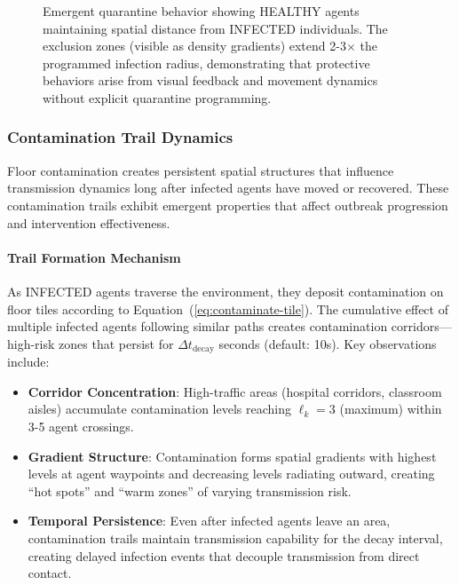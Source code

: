 \begin{figure}[t]
\centering
{}
\caption{Emergent quarantine behavior showing HEALTHY agents maintaining spatial distance from INFECTED individuals. The exclusion zones (visible as density gradients) extend 2-3$\times$ the programmed infection radius, demonstrating that protective behaviors arise from visual feedback and movement dynamics without explicit quarantine programming.}
\label{fig:quarantine-emergence}
\end{figure}

\subsubsection{Contamination Trail Dynamics}
\label{sec:contamination-trails}

Floor contamination creates persistent spatial structures that influence transmission dynamics long after infected agents have moved or recovered. These contamination trails exhibit emergent properties that affect outbreak progression and intervention effectiveness.

\paragraph{Trail Formation Mechanism}

As INFECTED agents traverse the environment, they deposit contamination on floor tiles according to Equation~(\ref{eq:contaminate-tile}). The cumulative effect of multiple infected agents following similar paths creates contamination corridors---high-risk zones that persist for $\Delta t_{\text{decay}}$ seconds (default: 10s). Key observations include:

\begin{itemize}
    \item \textbf{Corridor Concentration}: High-traffic areas (hospital corridors, classroom aisles) accumulate contamination levels reaching $\ell_k = 3$ (maximum) within 3-5 agent crossings.
    
    \item \textbf{Gradient Structure}: Contamination forms spatial gradients with highest levels at agent waypoints and decreasing levels radiating outward, creating ``hot spots'' and ``warm zones'' of varying transmission risk.
    
    \item \textbf{Temporal Persistence}: Even after infected agents leave an area, contamination trails maintain transmission capability for the decay interval, creating delayed infection events that decouple transmission from direct contact.
\end{itemize}

